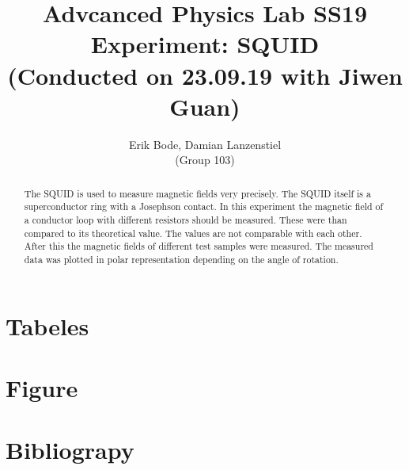 \documentclass[30pt,a4paper]{article}
\title{
	\large Advcanced Physics Lab	SS19 \\[4mm]
	\textbf{\LARGE Experiment: SQUID
	} \\[4mm]
	(Conducted on 23.09.19 with Jiwen Guan) \\}
\author{Erik Bode, Damian Lanzenstiel \\ (Group 103)}
\begin{document}
	
	\begin{titlepage}
		\maketitle
		\vspace{2cm}
		\begin{abstract}
			The SQUID is used to measure magnetic fields very precisely. The SQUID itself is a superconductor ring with a Josephson contact.  In this experiment the magnetic field of a conductor loop with different resistors should be measured. These were than compared to its theoretical value. The values are not comparable with each other. After this the magnetic fields of different test samples were measured. The measured data was plotted in polar representation depending on the angle of rotation. 
		\end{abstract}
	\end{titlepage}
	\newpage
	\tableofcontents
	\newpage
	
	
		
	
	
	
	
	
	
	\section{Tabeles}
	\listoftables
	\section{Figure}
	\listoffigures
	\section{Bibliograpy}
	
	
\end{document}
